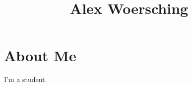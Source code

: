 \documentclass[letterpaper, 12pt]{article}
\title{Alex Woersching}
\begin{document}
\maketitle
\section{About Me}
\par I'm a student.
\end{document}
